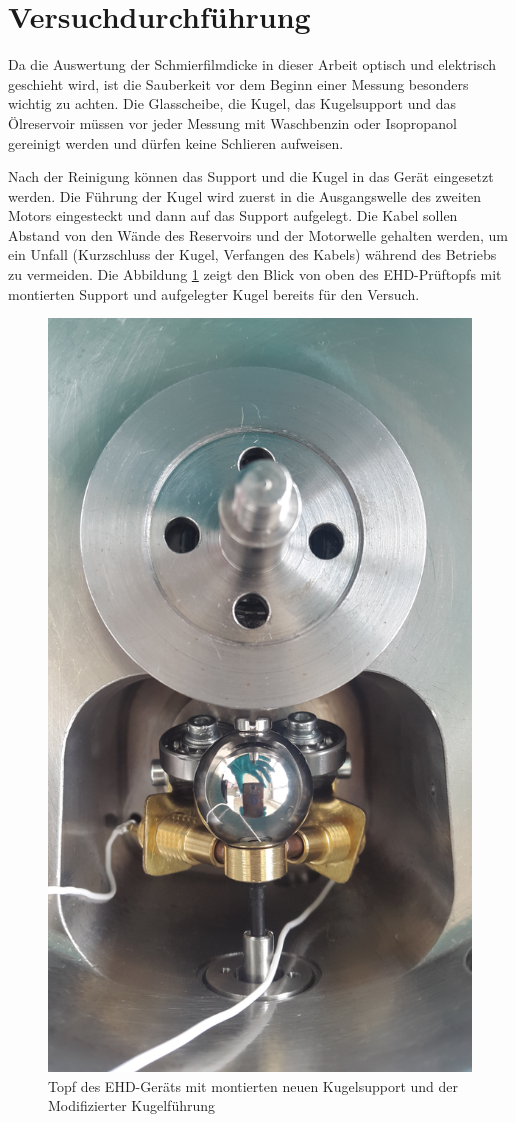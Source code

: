 \section{Versuchdurchführung}
\label{sec:versuchdurchfuehrung}

Da die Auswertung der Schmierfilmdicke in dieser Arbeit optisch und elektrisch geschieht wird, ist die Sauberkeit vor dem Beginn einer Messung besonders wichtig zu achten.
Die Glasscheibe, die Kugel, das Kugelsupport und das Ölreservoir müssen vor jeder Messung mit Waschbenzin oder Isopropanol gereinigt werden und dürfen keine Schlieren aufweisen.

Nach der Reinigung können das Support und die Kugel in das Gerät eingesetzt werden.
Die Führung der Kugel wird zuerst in die Ausgangswelle des zweiten Motors eingesteckt und dann auf das Support aufgelegt.
Die Kabel sollen Abstand von den Wände des Reservoirs und der Motorwelle gehalten werden, um ein Unfall (Kurzschluss der Kugel, Verfangen des Kabels) während des Betriebs zu vermeiden.
Die Abbildung \ref{fig:ehd_topf_mit_kugel_und_support} zeigt den Blick von oben des EHD-Prüftopfs mit montierten Support und aufgelegter Kugel bereits für den Versuch.
\begin{figure}[htb]
    \centering
    \includegraphics[width=0.7\linewidth]{./images/ehd_topf_mit_kugel_und_support.jpg}
    \caption{Topf des EHD-Geräts mit montierten neuen Kugelsupport und der Modifizierter Kugelführung}
    \label{fig:ehd_topf_mit_kugel_und_support}
\end{figure}

